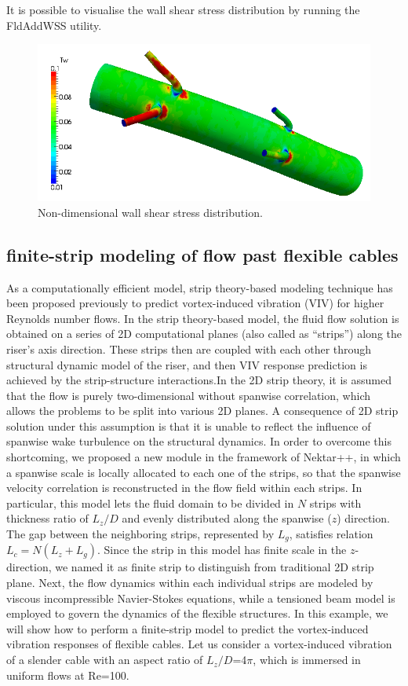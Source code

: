 It is possible to visualise the wall shear stress distribution by running the FldAddWSS utility.

\begin{figure}
\begin{center}
\includegraphics[width=12cm]{img/WSS.png}
\caption{Non-dimensional wall shear stress distribution.}
\end{center}
\end{figure}

\subsection{finite-strip modeling of flow past flexible cables}

As a computationally efficient model, strip theory-based modeling technique has been proposed previously to predict vortex-induced vibration (VIV) for higher Reynolds number flows. In the strip theory-based model, the fluid flow solution is obtained on a series of 2D computational planes (also called as “strips”) along the riser’s axis direction. These strips then are coupled with each other through structural dynamic model of the riser, and then VIV response prediction is achieved by the strip-structure interactions.In the 2D strip theory, it is assumed that the flow is purely two-dimensional without spanwise correlation, which allows the problems to be split into various 2D planes. A consequence of 2D strip solution under this assumption is that it is unable to reflect the influence of spanwise wake turbulence on the structural dynamics. In order to overcome this shortcoming, we proposed a new module in the framework of Nektar++, in which a spanwise scale is locally allocated to each one of the strips, so that the spanwise velocity correlation is reconstructed in the flow field within each strips. In particular, this model lets the fluid domain to be divided in $N$ strips with thickness ratio of $L_{z}/D$ and evenly distributed along the spanwise ($z$) direction. The gap between the neighboring strips, represented by $L_{g}$, satisfies relation $L_{c}=N(L_{z}+L_{g})$. Since the strip in this model has finite scale in the $z$-direction, we named it as finite strip to distinguish from traditional 2D strip plane. Next, the flow dynamics within each individual strips are modeled by viscous incompressible Navier-Stokes equations, while a tensioned beam model is employed to govern the dynamics of the flexible structures. In this example, we will show how to perform a finite-strip model to predict the vortex-induced vibration responses of flexible cables. Let us consider a vortex-induced vibration of a slender cable with an aspect ratio of $L_z/D$=4$\pi$, which is immersed in uniform flows at Re=100.

